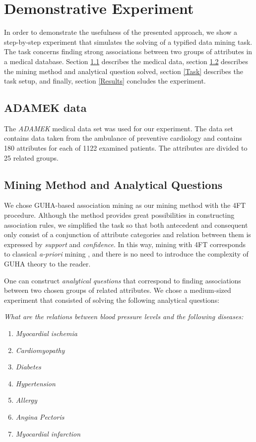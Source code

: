 \section{Demonstrative Experiment} \label{Experiments}

In order to demonstrate the usefulness of the presented approach, we show a step-by-step experiment that simulates the solving of a typified data mining task. 
The task concerns finding strong associations between two groups of attributes in a medical database. 
Section \ref{Adamek} describes the medical data, section \ref{Method} describes the mining method and analytical question solved, section \ref{Task} describes the task setup, and finally, section \ref{Results} concludes the experiment.

\subsection{ADAMEK data}\label{Adamek}
The \emph{ADAMEK} medical data set \cite{Adamek} was used for our experiment. 
The data set contains data taken from the ambulance of preventive cardiology and contains 180 attributes for each of 1122 examined patients. 
The attributes are divided to 25 related groups. 

\subsection{Mining Method and Analytical Questions}\label{Method}
We chose GUHA-based association mining as our mining method with the 4FT procedure. 
Although the method provides great possibilities in constructing association rules, we simplified the task so that both antecedent and consequent only consist of a conjunction of attribute categories and relation between them is expressed by \emph{support} and \emph{confidence}. 
In this way, mining with 4FT corresponds to classical \emph{a-priori} mining \cite{Agrawal}, and there is no need to introduce the complexity of GUHA theory to the reader. 

One can construct \emph{analytical questions} that correspond to finding associations between two chosen groups of related attributes. We chose a medium-sized experiment that consisted of solving the following analytical questions:

\medskip
\noindent
\emph{What are the relations between blood pressure levels and the following diseases:}
	\begin{enumerate}
		\item \emph{Myocardial ischemia}
		\item \emph{Cardiomyopathy}
		\item \emph{Diabetes}
		\item \emph{Hypertension}
		\item \emph{Allergy}
		\item \emph{Angina Pectoris}
		\item \emph{Myocardial infarction}
	\end{enumerate}

